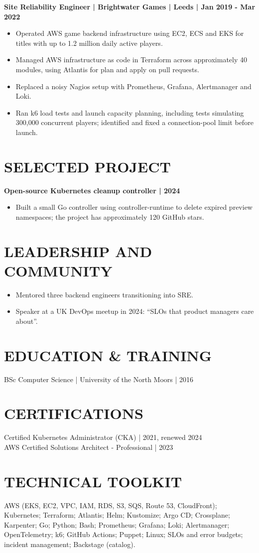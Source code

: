 \documentclass[11pt,a4paper]{article}
\begin{document}
\textbf{Site Reliability Engineer | Brightwater Games | Leeds | Jan 2019 - Mar 2022}
\begin{itemize}
\item Operated AWS game backend infrastructure using EC2, ECS and EKS for titles with up to 1.2 million daily active players.
\item Managed AWS infrastructure as code in Terraform across approximately 40 modules, using Atlantis for plan and apply on pull requests.
\item Replaced a noisy Nagios setup with Prometheus, Grafana, Alertmanager and Loki.
\item Ran k6 load tests and launch capacity planning, including tests simulating 300,000 concurrent players; identified and fixed a connection-pool limit before launch.
\end{itemize}

\section*{SELECTED PROJECT}
\textbf{Open-source Kubernetes cleanup controller | 2024}
\begin{itemize}
\item Built a small Go controller using controller-runtime to delete expired preview namespaces; the project has approximately 120 GitHub stars.
\end{itemize}

\section*{LEADERSHIP AND COMMUNITY}
\begin{itemize}
\item Mentored three backend engineers transitioning into SRE.
\item Speaker at a UK DevOps meetup in 2024: “SLOs that product managers care about”.
\end{itemize}

\section*{EDUCATION \& TRAINING}
BSc Computer Science | University of the North Moors | 2016

\section*{CERTIFICATIONS}
Certified Kubernetes Administrator (CKA) | 2021, renewed 2024\\
AWS Certified Solutions Architect - Professional | 2023

\section*{TECHNICAL TOOLKIT}
AWS (EKS, EC2, VPC, IAM, RDS, S3, SQS, Route 53, CloudFront); Kubernetes; Terraform; Atlantis; Helm; Kustomize; Argo CD; Crossplane; Karpenter; Go; Python; Bash; Prometheus; Grafana; Loki; Alertmanager; OpenTelemetry; k6; GitHub Actions; Puppet; Linux; SLOs and error budgets; incident management; Backstage (catalog).
\end{document}
